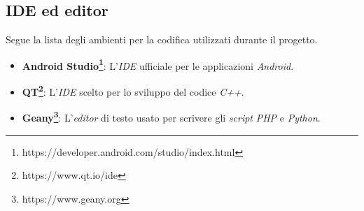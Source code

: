 \newpage
\subsection{IDE ed editor}
Segue la lista degli ambienti per la codifica utilizzati durante il progetto.
\begin{itemize}
	\item \textbf{Android Studio\footnote{https://developer.android.com/studio/index.html}}: L'\emph{IDE} ufficiale per le applicazioni \emph{Android}.
	\item \textbf{QT\footnote{https://www.qt.io/ide}}: L'\emph{IDE} scelto per lo sviluppo del codice \emph{C++}.
	\item \textbf{Geany\footnote{https://www.geany.org}}: L'\emph{editor} di testo usato per scrivere gli \emph{script} \emph{PHP} e \emph{Python}.
\end{itemize}

